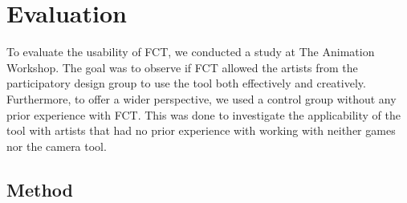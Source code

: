 \section{Evaluation}


To evaluate the usability of FCT, we conducted a study at The Animation Workshop. The goal was to observe if FCT allowed the artists from the participatory design group to use the tool both effectively and creatively. Furthermore, to offer a wider perspective, we used a control group without any prior experience with FCT. This was done to investigate the applicability of the tool with artists that had no prior experience with working with neither games nor the camera tool.


\subsection{Method} \label{method}







